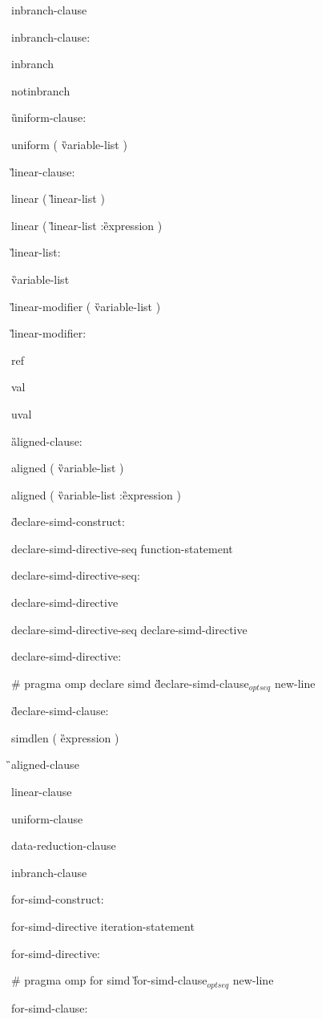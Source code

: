 {\I inbranch-clause

inbranch-clause:

\C\I inbranch

\I notinbranch

\G uniform-clause:

\C\I uniform ( \G variable-list \C )

\G linear-clause:

\C\I linear ( \G linear-list \C )

\C\I linear ( \G linear-list \C :\G expression \C )

\G linear-list:

\C\I\G variable-list

\C\I\G linear-modifier \C ( \G variable-list \C )

\G linear-modifier:

\C\I ref

\C\I val

\C\I uval

\G aligned-clause:

\C\I aligned ( \G variable-list \C )

\I aligned ( \G variable-list \C :\G expression \C )

\G declare-simd-construct:

\I declare-simd-directive-seq function-statement

declare-simd-directive-seq:

\I declare-simd-directive

\I declare-simd-directive-seq declare-simd-directive

declare-simd-directive:

\C\I \# pragma omp declare simd \G declare-simd-clause$_{optseq}$ new-line

\G declare-simd-clause:

\C\I simdlen ( \G expression \C )

\G\I aligned-clause

\I linear-clause

\I uniform-clause

\I data-reduction-clause

\I inbranch-clause

for-simd-construct:

\I for-simd-directive iteration-statement

for-simd-directive:

\C\I \# pragma omp for simd \G for-simd-clause$_{optseq}$ new-line

for-simd-clause:

}
